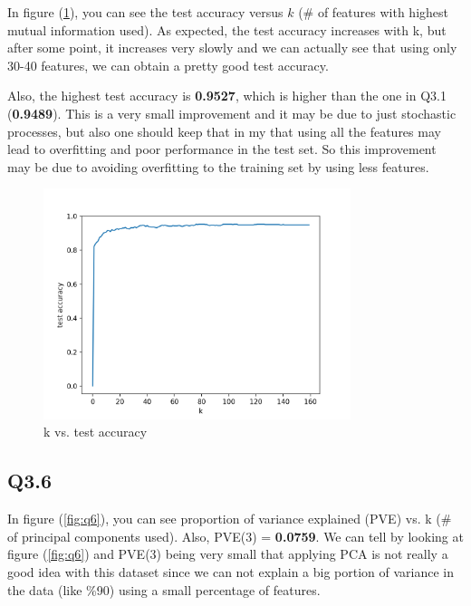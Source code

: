 \documentclass[12pt]{report}
\begin{document}
In figure (\ref{fig:q5}), you can see the test accuracy versus $k$ (\# of features with highest mutual information used). As expected, the test accuracy increases with k, but after some point, it increases very slowly and we can actually see that using only 30-40 features, we can obtain a pretty good test accuracy.

Also, the highest test accuracy is \textbf{0.9527}, which is higher than the one in Q3.1 (\textbf{0.9489}). This is a very small improvement and it may be due to just stochastic processes, but also one should keep that in my that using all the features may lead to overfitting and poor performance in the test set. So this improvement may be due to avoiding overfitting to the training set by using less features.

\begin{figure}[h!]
  \centering
  \includegraphics[width=0.8\textwidth]{q5}
  \caption{k vs. test accuracy}
  \label{fig:q5}
\end{figure}

\subsection*{Q3.6}

In figure (\ref{fig:q6}), you can see proportion of variance explained (PVE) vs. k (\# of principal components used). Also, PVE(3) = \textbf{0.0759}. We can tell by looking at figure (\ref{fig:q6}) and PVE(3) being very small that applying PCA is not really a good idea with this dataset since we can not explain a big portion of variance in the data (like \%90) using a small percentage of features.
\end{document}

